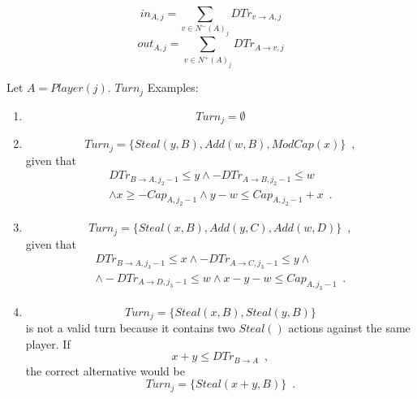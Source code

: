 \documentclass[11pt]{llncs}
\theoremstyle{definition}
\begin{document}
     \begin{definition}
     \label{inouttrust}
        \begin{equation}
           in_{A, j} = \sum\limits_{v \in N^{-}\left(A\right)_j}DTr_{v \rightarrow A, j}
        \end{equation}
        \begin{equation}
           out_{A, j} = \sum\limits_{v \in N^{+}\left(A\right)_j}DTr_{A \rightarrow v, j}
        \end{equation}
     \end{definition}
     
     Let $A = Player(j)$. $Turn_j$ Examples:
     \begin{enumerate}
        \item \begin{equation*}
           Turn_j = \emptyset
        \end{equation*}
        \item \begin{equation*}
           Turn_j = \{Steal\left(y, B\right), Add\left(w, B\right), ModCap\left(x\right)\} \enspace,
        \end{equation*}
        given that
        \begin{equation*}
        \begin{gathered}
           DTr_{B \rightarrow A, j_2 - 1} \leq y \wedge -DTr_{A \rightarrow B, j_2 - 1} \leq w \\
           \wedge x \geq -Cap_{A, j_2-1} \wedge y - w \leq Cap_{A, j_2-1} + x \enspace.
        \end{gathered}
        \end{equation*}
        \item \begin{equation*}
           Turn_j = \{Steal\left(x, B\right), Add\left(y, C\right), Add\left(w, D\right)\} \enspace,
        \end{equation*}
        given that
        \begin{equation*}
        \begin{gathered}
           DTr_{B \rightarrow A, j_3 - 1} \leq x \wedge -DTr_{A \rightarrow C, j_3-1} \leq y \wedge \\
           \wedge -DTr_{A \rightarrow D, j_3 - 1} \leq w \wedge x - y - w \leq Cap_{A, j_3-1} \enspace.
        \end{gathered}
        \end{equation*}
        \item \begin{equation*}
           Turn_j = \{Steal\left(x, B\right), Steal\left(y, B\right)\}
        \end{equation*}
        is not a valid turn because it contains two $Steal\left(\right)$ actions against the same player. If
        \begin{equation*}
           x + y \leq DTr_{B \rightarrow A} \enspace,
        \end{equation*}
        the correct alternative would be
        \begin{equation*}
           Turn_j = \{Steal\left(x+y, B\right)\} \enspace.
        \end{equation*}
     \end{enumerate}
\end{document}
